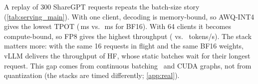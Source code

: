 A replay of 300 ShareGPT requests repeats the batch-size story (\cref{tab:serving_main}). With one client, decoding is memory-bound, so AWQ-INT4 gives the lowest TPOT
(\SrvTPOTawqOne\,ms vs.\ \SrvTPOTbfOne\,ms for BF16). With 64 clients it becomes compute-bound, so FP8
gives the highest throughput (\SrvThrFP{} vs.\ \SrvThrBF{} tokens/s). The stack matters more: with
the same 16 requests in flight and the same BF16 weights, vLLM delivers \SrvGap{} the throughput of
HF, whose static batches wait for their longest request. This gap comes from continuous
batching~\cite{yu2022orca} and CUDA graphs, not from quantization (the stacks are timed differently;
\cref{app:real}).
